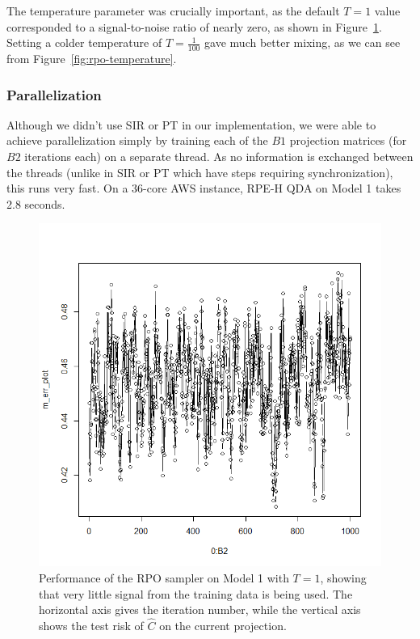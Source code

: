 \documentclass{amsart}
\begin{document}
The temperature parameter was crucially important, as the default $T=1$ value corresponded to a signal-to-noise ratio of nearly zero, as shown in Figure~\ref{fig:rpo-no-temperature}. Setting a colder temperature of $T=\frac{1}{100}$ gave much better mixing, as we can see from Figure~\ref{fig:rpo-temperature}.

\subsubsection{Parallelization}

Although we didn't use SIR or PT in our implementation, we were able to achieve parallelization simply by training each of the $B1$ projection matrices (for $B2$ iterations each) on a separate thread. As no information is exchanged between the threads (unlike in SIR or PT which have steps requiring synchronization), this runs very fast. On a 36-core AWS instance, RPE-H QDA on Model 1 takes 2.8 seconds.

\begin{figure}
	\begin{centering}
		\includegraphics[scale=0.3]{rpo-no-temperature}
		\par\end{centering}
	\caption{Performance of the RPO sampler on Model 1 with $T=1$, showing that very little signal from the training data is being used. The horizontal axis gives the iteration number, while the vertical axis shows the test risk of $\hat C$ on the current projection.}
	\label{fig:rpo-no-temperature}
\end{figure}
\end{document}
